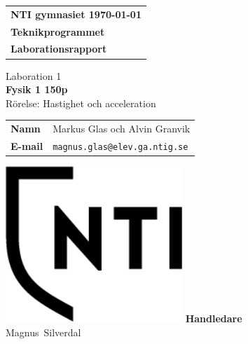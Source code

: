 \documentclass[11p, titlepage, oneside, a4paper]{article}
\makeatletter
\def\inst{Teknikprogrammet}
\def\typeofdoc{Laborationsrapport}
\def\course{Fysik 1 150p}
\def\pretitle{Laboration 1}
\def\title{Rörelse: Hastighet och acceleration}
\def\name{Markus Glas och Alvin Granvik}
\def\username{magnus.glas}
\def\email{\username{}@elev.ga.ntig.se}
\def\graders{Magnus Silverdal}
\makeatother
\begin{document}
\begin{titlepage}
		\thispagestyle{empty}
		\begin{large}
			\begin{tabular}{@{}p{\textwidth}@{}}
				\textbf{NTI gymnasiet \hfill \today} \\
				\textbf{\inst} \\
				\textbf{\typeofdoc} \\
			\end{tabular}
		\end{large}
		\vspace{10mm}
		\begin{center}
			\LARGE{\pretitle} \\
			\huge{\textbf{\course}}\\
			\vspace{10mm}
			\LARGE{\title} \\
			\vspace{15mm}
			\begin{large}
				\begin{tabular}{ll}
					\textbf{Namn} & \name \\
					\textbf{E-mail} & \texttt{\email} \\
				\end{tabular}
			\end{large}
			\vfill
            \includegraphics[width=0.5\textwidth]{images/NTI Gymnasiet_Symbol_print_svart.png}
			\vfill
            \large{\textbf{Handledare}}\\
			\mbox{\large{\graders}}
		\end{center}
	\end{titlepage}
\end{document}
